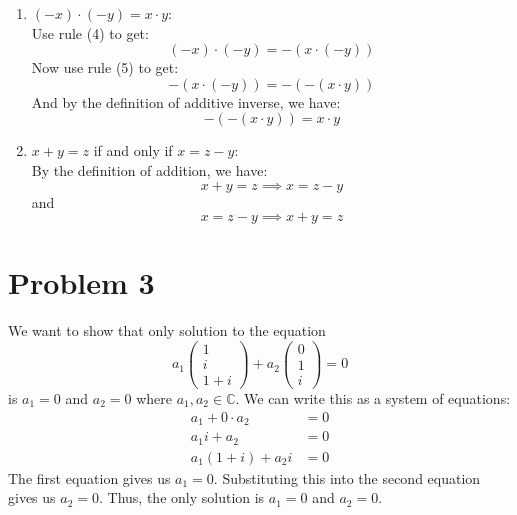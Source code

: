 \documentclass{article}
\begin{document}
\begin{enumerate}
    \item $(-x) \cdot (-y) = x \cdot y$: \\
    Use rule (4) to get:
    \[
      (-x) \cdot (-y) = -(x \cdot (-y))
    \]
    Now use rule (5) to get:
    \[
      -(x \cdot (-y)) = -(-(x \cdot y))
    \]
      And by the definition of additive inverse, we have:
      \[
         -(-(x \cdot y)) = x \cdot y
      \]
    \item $x + y = z$ if and only if $x = z - y$: \\
    By the definition of addition, we have:
    \[
    x + y = z \implies x = z - y
    \]
    and
    \[
    x = z - y \implies x + y = z
    \]
\end{enumerate}

\section*{Problem 3}

We want to show that only solution to the equation
\[
   a_1 \begin{pmatrix}
      1 \\
      i \\
      1 + i
   \end{pmatrix} + a_2 \begin{pmatrix}
      0 \\
      1 \\
      i
   \end{pmatrix} = 0
\]
is \(a_1 = 0\) and \(a_2 = 0\) where \(a_1, a_2 \in \mathbb{C}\).
We can write this as a system of equations:
\begin{align*}
   a_1 + 0 \cdot a_2 &= 0 \\
   a_1 i + a_2 &= 0 \\
   a_1 (1 + i) + a_2 i &= 0
\end{align*}
The first equation gives us \(a_1 = 0\). Substituting this into the second equation gives us \(a_2 = 0\). Thus, the only solution is \(a_1 = 0\) and \(a_2 = 0\).
\end{document}
